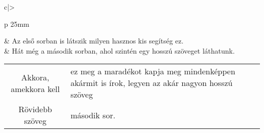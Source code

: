 \documentclass[a4paper]{article}
\begin{document}
\newcommand*{\tabsorvege}[1]{\let\tmp=\\#1\let\\=\tmp}
\begin{tabular}{c|>{\tabsorvege{\raggedright}\mbox{}}p{
25mm}}  & Az első sorban is látszik milyen hasznos kis
segítség ez. \\  & Hát még a második sorban, ahol szintén egy hosszú
szöveget láthatunk. \\ \hline
\end{tabular}

\begin{tabularx}{\linewidth}{c|X} Akkora, amekkora kell
& ez meg a maradékot kapja meg mindenképpen akármit is
írok, legyen az akár nagyon hosszú szöveg \\ Rövidebb
szöveg & második sor. \end{tabularx}
\end{document}
